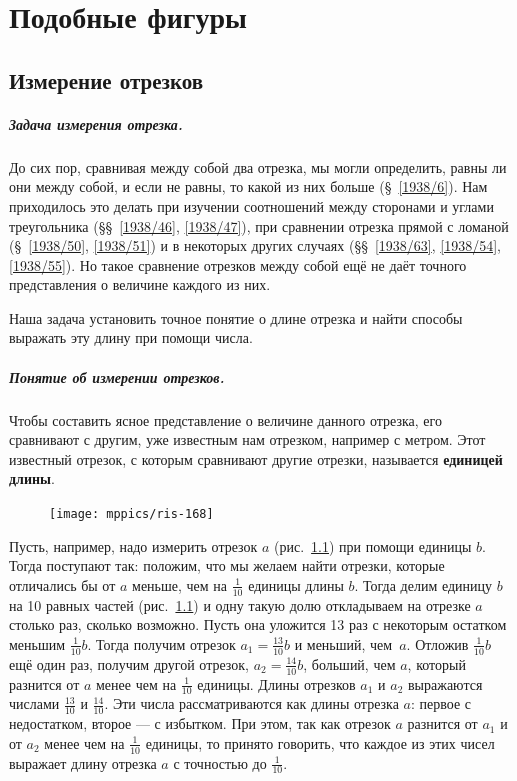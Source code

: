 \documentclass[oneside]{book}
\makeatletter
\newcommand{\rindex}[2][\imki@jobname]{%
  \index[#1]{\detokenize{#2}}%
}
\makeatother
\begin{document}
\chapter{Подобные фигуры}

\section{Измерение отрезков}

\paragraph{Задача измерения отрезка.}\label{1938/144}
До сих пор, сравнивая между собой два отрезка, мы могли определить, равны ли они между собой, и если не равны, то какой из них больше (§~\ref{1938/6}).
Нам приходилось это делать при изучении соотношений между сторонами и углами треугольника (§§~\ref{1938/46}, \ref{1938/47}), при сравнении отрезка прямой с ломаной (§~\ref{1938/50}, \ref{1938/51}) и в некоторых других случаях (§§~\ref{1938/63}, \ref{1938/54}, \ref{1938/55}).
Но такое сравнение отрезков между собой ещё не даёт точного представления о величине каждого из них.

Наша задача установить точное понятие о длине отрезка и найти способы выражать эту длину при помощи числа.

\paragraph{Понятие об измерении отрезков.}\label{1938/150} 
Чтобы составить ясное представление о величине данного отрезка, его сравнивают с другим, уже известным нам отрезком, например с метром.
Этот известный отрезок, с которым сравнивают другие отрезки, называется \rindex{единица длины}\textbf{единицей длины}.

\begin{figure}[h!]
\centering
\texttt{[image: mppics/ris-168]}
\caption{}\label{1938/ris-168}
\end{figure}

Пусть, например, надо измерить отрезок $a$ (рис.~\ref{1938/ris-168}) при помощи единицы $b$.
Тогда поступают так:
положим, что мы желаем найти отрезки, которые отличались бы от $a$ меньше, чем на
$\tfrac1{10}$ единицы длины $b$.
Тогда делим единицу $b$ на 10 равных частей (рис.~\ref{1938/ris-168}) и одну такую долю откладываем на отрезке $a$ столько раз, сколько возможно.
Пусть она уложится 13 раз с некоторым остатком меньшим $\tfrac1{10}b$.
Тогда получим отрезок $a_1=\tfrac{13}{10}b$ и меньший, чем~$a$.
Отложив $\tfrac1{10}b$ ещё один раз, получим другой отрезок, $a_2=\tfrac{14}{10}b$,  больший, чем $a$, который разнится от $a$ менее чем на $\tfrac1{10}$ единицы.
Длины отрезков $a_1$ и $a_2$ выражаются числами $\tfrac{13}{10}$ и $\tfrac{14}{10}$.
Эти числа рассматриваются как  длины отрезка $a$:
первое с недостатком, второе — с избытком.
При этом, так как отрезок $a$ разнится от $a_1$ и от $a_2$ менее чем на $\tfrac1{10}$ единицы, то принято говорить, что каждое из этих чисел выражает длину отрезка $a$ с точностью до $\tfrac1{10}$.
\end{document}
